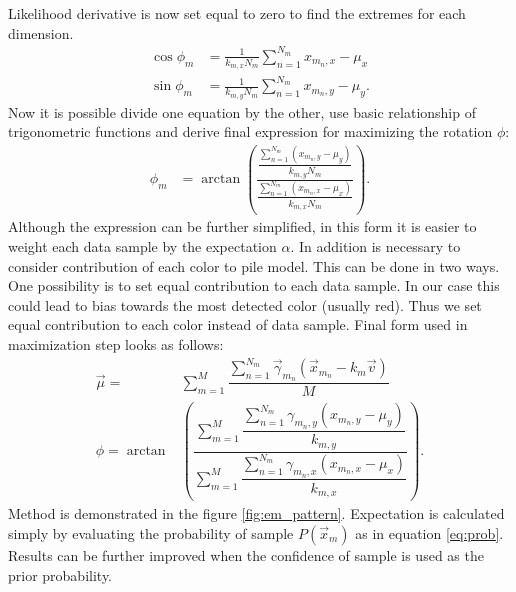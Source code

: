 Likelihood derivative is now set equal to zero to find the extremes for each dimension.
\begin{align}
\cos \phi_m &= \frac{1}{k_{m, x}N_m} \sum_{n = 1}^{N_m} x_{m_n, x} - \mu_x \\ 
\sin \phi_m &=  \frac{1}{k_{m, y}N_m} \sum_{n = 1}^{N_m} x_{m_n, y} - \mu_y .
\end{align}
Now it is possible divide one equation by the other, use basic relationship of trigonometric functions and derive final expression for maximizing the rotation $\phi$:
\begin{align}
\phi_m &= \arctan \left( \frac{\dfrac{\sum_{n = 1}^{N_m} \left( x_{m_n, y} - \mu_y \right)}{k_{m, y}N_m} }{ \dfrac{\sum_{n = 1}^{N_m} \left( x_{m_n, x} - \mu_x \right)}{k_{m, x}N_m} }\right).
\end{align}
Although the expression can be further simplified, in this form it is easier to weight each data sample by the expectation $\alpha$. In addition is necessary to consider contribution of each color to pile model. This can be done in two ways. One possibility is to set equal contribution to each data sample. In our case this could lead to bias towards the most detected color (usually red). Thus we set equal contribution to each color instead of data sample. Final form used in maximization step looks as follows:
\begin{align}
\vec{\mu} =& \sum_{m=1}^M \dfrac{\sum_{n = 1}^{N_m}  \vec{\gamma}_{m_n} \left( \vec{x}_{m_n} - k_m \vec{v} \right) }{M} \\
\phi = \arctan & \left( \dfrac{\sum_{m=1}^{M} \dfrac{\sum_{n = 1}^{N_m} \gamma_{m_n, y}(x_{m_n, y} - \mu_y)}{k_{m, y} } }{\sum_{m=1}^{M} \dfrac{\sum_{n = 1}^{N_m} \gamma_{m_n, x} (x_{m_n, x} - \mu_x) }{k_{m, x}} }\right).
\end{align}
Method is demonstrated in the figure \ref{fig:em_pattern}. Expectation is calculated simply by evaluating the probability of sample $P(\vec{x}_m)$ as in equation \ref{eq:prob}. Results can be further improved when the confidence of sample is used as the prior probability.

